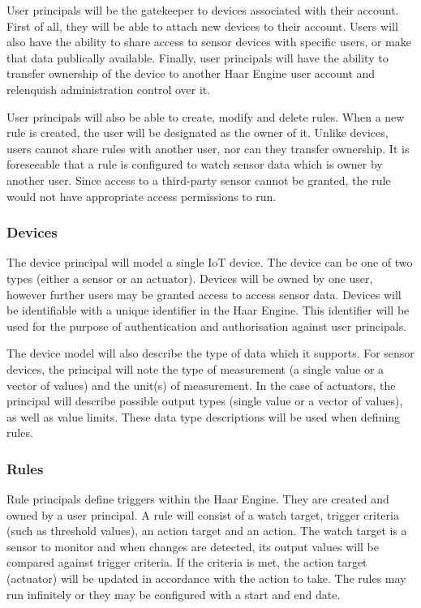         User principals will be the gatekeeper to devices associated with their account. First of all, they will be able to attach new devices to their account. Users will also have the ability to share access to sensor devices with specific users, or make that data publically available. Finally, user principals will have the ability to transfer ownership of the device to another Haar Engine user account and relenquish administration control over it.

        User principals will also be able to create, modify and delete rules. When a new rule is created, the user will be designated as the owner of it. Unlike devices, users cannot share rules with another user, nor can they transfer ownership. It is foreseeable that a rule is configured to watch sensor data which is owner by another user. Since access to a third-party sensor cannot be granted, the rule would not have appropriate access permissions to run.

      \subsubsection{Devices}
        The device principal will model a single IoT device. The device can be one of two types (either a sensor or an actuator). Devices will be owned by one user, however further users may be granted access to access sensor data. Devices will be identifiable with a unique identifier in the Haar Engine. This identifier will be used for the purpose of authentication and authorisation against user principals.

        The device model will also describe the type of data which it supports. For sensor devices, the principal will note the type of measurement (a single value or a vector of values) and the unit(s) of measurement. In the case of actuators, the principal will describe possible output types (single value or a vector of values), as well as value limits. These data type descriptions will be used when defining rules.

      \subsubsection{Rules}
        Rule principals define triggers within the Haar Engine. They are created and owned by a user principal. A rule will consist of a watch target, trigger criteria (such as threshold values), an action target and an action. The watch target is a sensor to monitor and when changes are detected, its output values will be compared against trigger criteria. If the criteria is met, the action target (actuator) will be updated in accordance with the action to take. The rules may run infinitely or they may be configured with a start and end date.

